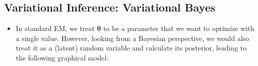 \subsection{Variational Inference: Variational Bayes}
\begin{itemize}
	\item In standard EM, we treat $\bm{\theta}$ to be a parameter that we want to optimize with a single value. However, looking from a Bayesian perspective, we would also treat it as a (latent) random variable and calculate its posterior, leading to the following graphical model:
	\begin{figure}[ht!]
		\centering
\end{figure}
\end{itemize}
